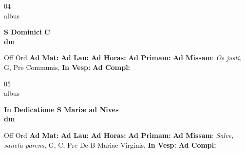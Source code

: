 \documentclass[10pt, openany]{book}
\begin{document}
    \begin{center}
        \begin{minipage}{3.5in}
            \vspace{2em}
            \begin{minipage}{0.5in}
                {\Huge 04} \\
                {\normalsize albus}
            \end{minipage}
            \begin{minipage}{3.0in}
                \textbf{ \large S Dominici C \\
                \textnormal{\normalsize dm}}

            \end{minipage}
            \begin{justify}Off Ord
                \textbf{Ad Mat: }
                \textbf{Ad Lau: }
                \textbf{Ad Horas: }
                \textbf{Ad Primam: }\textbf{Ad Missam}: \textit{Os justi,} G, Pre Communis, 
                \textbf{In Vesp: }
                \textbf{Ad Compl: }
            \end{justify}
        \end{minipage}
    \end{center}

    \begin{center}
        \begin{minipage}{3.5in}
            \vspace{2em}
            \begin{minipage}{0.5in}
                {\Huge 05} \\
                {\normalsize albus}
            \end{minipage}
            \begin{minipage}{3.0in}
                \textbf{ \large In Dedicatione S Mariæ ad Nives \\
                \textnormal{\normalsize dm}}

            \end{minipage}
            \begin{justify}Off Ord
                \textbf{Ad Mat: }
                \textbf{Ad Lau: }
                \textbf{Ad Horas: }
                \textbf{Ad Primam: }\textbf{Ad Missam}: \textit{Salve, sancta parens,} G, C, Pre De B Mariae Virginis, 
                \textbf{In Vesp: }
                \textbf{Ad Compl: }
            \end{justify}
        \end{minipage}
    \end{center}
\end{document}
